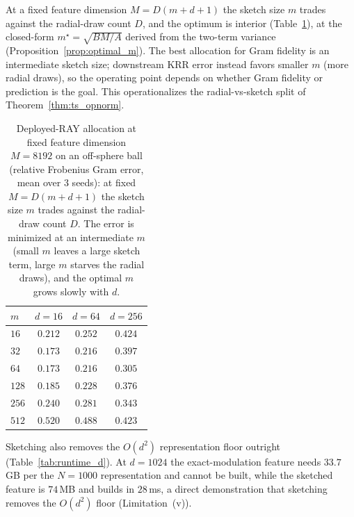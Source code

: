 \documentclass{article}
\begin{document}
At a fixed feature dimension $M=D(m{+}d{+}1)$ the sketch size $m$ trades against the radial-draw count $D$, and the optimum is interior (Table~\ref{tab:dm}), at the closed-form $m^\star=\sqrt{BM/A}$ derived from the two-term variance (Proposition~\ref{prop:optimal_m}). The best allocation for Gram fidelity is an intermediate sketch size; downstream KRR error instead favors smaller $m$ (more radial draws), so the operating point depends on whether Gram fidelity or prediction is the goal. This operationalizes the radial-vs-sketch split of Theorem~\ref{thm:ts_opnorm}.

\begin{table}[h]
\centering
\caption{Deployed-RAY allocation at fixed feature dimension $M=8192$ on an off-sphere ball (relative Frobenius Gram error, mean over $3$ seeds): at fixed $M=D(m{+}d{+}1)$ the sketch size $m$ trades against the radial-draw count $D$. The error is minimized at an intermediate $m$ (small $m$ leaves a large sketch term, large $m$ starves the radial draws), and the optimal $m$ grows slowly with $d$.}
\label{tab:dm}
\begin{tabular}{lccc}
\toprule
$m$ & $d{=}16$ & $d{=}64$ & $d{=}256$ \\
\midrule
$16$  & $0.212$ & $0.252$ & $0.424$ \\
$32$  & $\mathbf{0.173}$ & $\mathbf{0.216}$ & $0.397$ \\
$64$  & $0.173$ & $0.216$ & $0.305$ \\
$128$ & $0.185$ & $0.228$ & $0.376$ \\
$256$ & $0.240$ & $0.281$ & $0.343$ \\
$512$ & $0.520$ & $0.488$ & $0.423$ \\
\bottomrule
\end{tabular}
\end{table}

Sketching also removes the $O(d^2)$ representation floor outright (Table~\ref{tab:runtime_d}). At $d{=}1024$ the exact-modulation feature needs $33.7$\,GB per the $N{=}1000$ representation and cannot be built, while the sketched feature is $74$\,MB and builds in $28$\,ms, a direct demonstration that sketching removes the $O(d^2)$ floor (Limitation~(v)).
\end{document}
